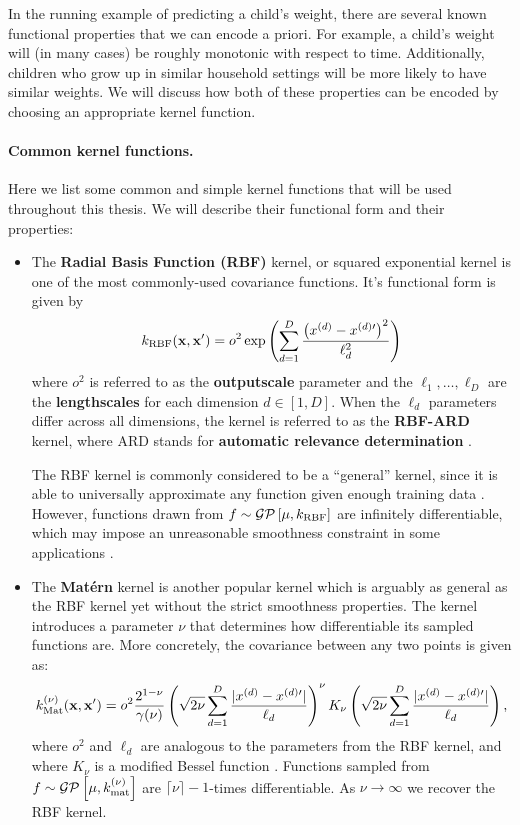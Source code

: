 In the running example of predicting a child's weight, there are several known functional properties that we can encode a priori.
For example, a child's weight will (in many cases) be roughly monotonic with respect to time.
Additionally, children who grow up in similar household settings will be more likely to have similar weights.
We will discuss how both of these properties can be encoded by choosing an appropriate kernel function.

\paragraph{Common kernel functions.}
Here we list some common and simple kernel functions that will be used throughout this thesis.
We will describe their functional form and their properties:
%
\begin{itemize}
  \item The {\bf Radial Basis Function (RBF)} kernel, or squared exponential kernel is one of the most commonly-used covariance functions.
    It's functional form is given by
    \[ k_\text{RBF}(\mathbf{x}, \mathbf{x}') = o^2 \exp \left( \sum_{d=1}^D \frac{\left( x^{(d)} - x^{(d)\prime} \right)^2}{\ell_d^2}  \right) \]
    where $o^2$ is referred to as the {\bf outputscale} parameter and the $\ell_1, \ldots, \ell_D$ are the {\bf lengthscales} for each dimension $d \in [1, D]$.
    When the $\ell_d$ parameters differ across all dimensions, the kernel is referred to as the {\bf RBF-ARD } kernel, where ARD stands for {\bf automatic relevance determination }.

    The RBF kernel is commonly considered to be a ``general'' kernel, since it is able to universally approximate any function given enough training data \cite{micchelli2006universal}.
		However, functions drawn from $f \sim \mathcal{GP} \left[ \mu, k_\text{RBF} \right]$ are infinitely differentiable, which may impose an unreasonable smoothness constraint in some applications \cite{stein2012interpolation}.

	\item The {\bf Mat\'{e}rn} kernel is another popular kernel which is arguably as general as the RBF kernel yet without the strict smoothness properties.
		The kernel introduces a parameter $\nu$ that determines how differentiable its sampled functions are.
		More concretely, the covariance between any two points is given as:
    \[
      k_{\text{Mat}}^{(\nu)} (\mathbf{x}, \mathbf{x}') = o^2 \frac{2^{1 - \nu}}{\gamma(\nu)}
			\left( \sqrt{2 \nu} \sum_{d=1}^D \frac{\vert x^{(d)} - x^{(d)\prime} \vert}{\ell_d}  \right)^\nu
			K_\nu \left( \sqrt{2 \nu} \sum_{d=1}^D \frac{\vert x^{(d)} - x^{(d)\prime} \vert}{\ell_d}  \right),
		\]
    where $o^2$ and $\ell_d$ are analogous to the parameters from the RBF kernel, and where $K_\nu$ is a modified Bessel function \cite{rasmussen2006gaussian}.
    Functions sampled from $f \sim \mathcal{GP} \left[ \mu, k_{\text{mat}}^{(\nu)} \right]$ are $\lceil \nu \rceil - 1$-times differentiable.
    As $\nu \rightarrow \infty$ we recover the RBF kernel.


\end{itemize}
